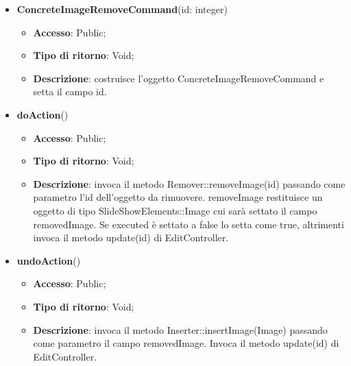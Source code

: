 {{{	
	\begin{itemize}
		\item \textbf{ConcreteImageRemoveCommand}(id: integer)
		\begin{itemize}
			\item \textbf{Accesso}: Public;
			\item \textbf{Tipo di ritorno}: Void;
			\item \textbf{Descrizione}: costruisce l’oggetto ConcreteImageRemoveCommand e setta il campo id.
		\end{itemize}
		\item \textbf{doAction}()
		\begin{itemize}
			\item \textbf{Accesso}: Public;
			\item \textbf{Tipo di ritorno}: Void;
			\item \textbf{Descrizione}: invoca il metodo Remover::removeImage(id) passando come parametro l’id dell’oggetto da rimuovere. removeImage restituisce un oggetto di tipo SlideShowElements::Image cui sarà settato il campo removedImage. Se executed è settato a false lo setta come true, altrimenti invoca il metodo update(id) di EditController.
		\end{itemize}
		\item \textbf{undoAction}()
		\begin{itemize}
			\item \textbf{Accesso}: Public;
			\item \textbf{Tipo di ritorno}: Void;
			\item \textbf{Descrizione}: invoca il metodo Inserter::insertImage(Image) passando come parametro il campo removedImage. Invoca il metodo update(id) di EditController.
		\end{itemize}
	\end{itemize}
	}
}}
